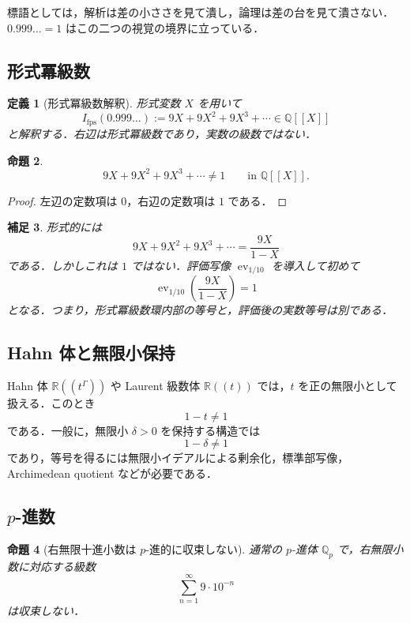 \documentclass[a4paper,11pt]{ltjsarticle}
\theoremstyle{jpdef}
\newtheorem{definition}{定義}[section]
\newtheorem{remark}[definition]{補足}
\theoremstyle{jpthm}
\newtheorem{proposition}[definition]{命題}
\newcommand{\Q}{\mathbb{Q}}
\newcommand{\R}{\mathbb{R}}
\newcommand{\ev}{\operatorname{ev}}
\begin{document}
標語としては，解析は差の小ささを見て潰し，論理は差の台を見て潰さない．\(0.999\ldots=1\) はこの二つの視覚の境界に立っている．

\subsection{形式冪級数}

\begin{definition}[形式冪級数解釈]
形式変数 \(X\) を用いて
\[
  I_{\mathrm{fps}}(0.999\ldots):=9X+9X^2+9X^3+\cdots\in\Q[[X]]
\]
と解釈する．右辺は形式冪級数であり，実数の級数ではない．
\end{definition}

\begin{proposition}
\[
  9X+9X^2+9X^3+\cdots\ne1
  \qquad\text{in }\Q[[X]].
\]
\end{proposition}

\begin{proof}
左辺の定数項は \(0\)，右辺の定数項は \(1\) である．
\end{proof}

\begin{remark}
形式的には
\[
  9X+9X^2+9X^3+\cdots=\frac{9X}{1-X}
\]
である．しかしこれは \(1\) ではない．評価写像 \(\ev_{1/10}\) を導入して初めて
\[
  \ev_{1/10}\left(\frac{9X}{1-X}\right)=1
\]
となる．つまり，形式冪級数環内部の等号と，評価後の実数等号は別である．
\end{remark}

\subsection{Hahn 体と無限小保持}

Hahn 体 \(\R((t^\Gamma))\) や Laurent 級数体 \(\R((t))\) では，\(t\) を正の無限小として扱える．このとき
\[
  1-t\ne1
\]
である．一般に，無限小 \(\delta>0\) を保持する構造では
\[
  1-\delta\ne1
\]
であり，等号を得るには無限小イデアルによる剰余化，標準部写像，Archimedean quotient などが必要である．

\subsection{\(p\)-進数}

\begin{proposition}[右無限十進小数は \(p\)-進的に収束しない]
通常の \(p\)-進体 \(\Q_p\) で，右無限小数に対応する級数
\[
  \sum_{n=1}^{\infty}9\cdot10^{-n}
\]
は収束しない．
\end{proposition}
\end{document}

